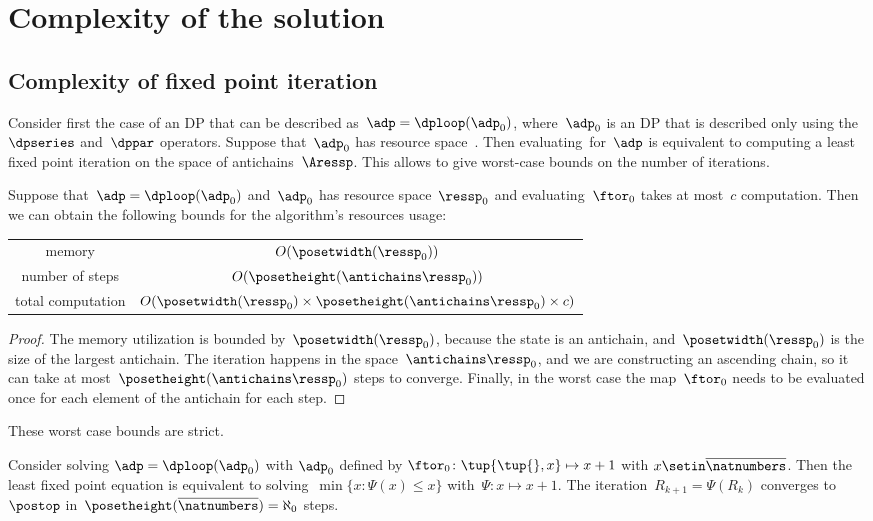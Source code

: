 
\section{Complexity of the solution}

\subsection{Complexity of fixed point iteration}

Consider first the case of an DP that can be described as~$\adp=\dploop(\adp_{0})$, where~$\adp_{0}$ is an DP that is described only using the~$\dpseries$ and~$\dppar$ operators.
Suppose that~$\adp_{0}$ has resource space~\ressp.
Then evaluating~\ftor for~$\adp$ is equivalent to computing a least fixed point iteration on the space of antichains~$\Aressp$.
This allows to give worst-case bounds on the number of iterations.

\begin{proposition}
    \label{prop:complexity}
    Suppose that~$\adp=\dploop(\adp_{0})$ and~$\adp_{0}$ has resource space~$\ressp_{0}$ and evaluating~$\ftor_{0}$ takes at most~$c$ computation.
    Then we can obtain the following bounds for the algorithm's resources usage:

    \smallskip{}
    \begin{tabular}{cc}
        memory            & $O(\posetwidth(\ressp_{0}))$\tabularnewline
        number of steps   & $O(\posetheight(\antichains\ressp_{0}))$\tabularnewline
        total computation & $O(\posetwidth(\ressp_{0})\times\posetheight(\antichains\ressp_{0})\times c)$\tabularnewline
    \end{tabular}

\end{proposition}
\begin{proof}
    The memory utilization is bounded by~$\posetwidth(\ressp_{0})$, because the state is an antichain, and~$\posetwidth(\ressp_{0})$ is the size of the largest antichain.
    The iteration happens in the space~$\antichains\ressp_{0}$, and we are constructing an ascending chain, so it can take at most~$\posetheight(\antichains\ressp_{0})$ steps to converge.
    Finally, in the worst case the map~$\ftor_{0}$ needs to be evaluated once for each element of the antichain for each step.
\end{proof}
These worst case bounds are strict.
\begin{example}
    Consider solving $\adp=\dploop(\adp_{0})$ with $\adp_{0}$ defined by $\ftor_{0}\colon\tup{ \tup{ } ,x} \mapsto x+1$ with $x\setin\overline{\natnumbers}$.
    Then the least fixed point equation is equivalent to solving~$\min\{x\colon\Psi(x)\leq x\}$ with~$\Psi:x\mapsto x+1$.
    The iteration~$R_{k+1}=\Psi(R_{k})$ converges to~$\postop$ in~$\posetheight(\overline{\natnumbers})=\aleph_{0}$ steps.
\end{example}

